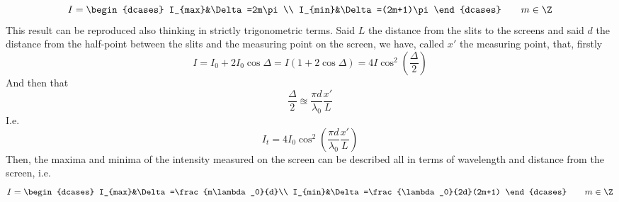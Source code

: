 \documentclass[../electromagnetism.tex]{subfiles}
\begin{document}
\begin{equation}
	I=\begin{dcases}
		I_{max}&\Delta=2m\pi\\
		I_{min}&\Delta=(2m+1)\pi
	\end{dcases}\qquad m\in\Z
	\label{eq:imaximinyoung.yint}
\end{equation}
This result can be reproduced also thinking in strictly trigonometric terms. Said $L$ the distance from the slits to the screens and said $d$ the distance from the half-point between the slits and the measuring point on the screen, we have, called $x'$ the measuring point, that, firstly
\begin{equation*}
	I=I_0+2I_0\cos\Delta=I\left( 1+2\cos\Delta \right)=4I\cos^2\left( \frac{\Delta}{2} \right)
\end{equation*}
And then that
\begin{equation}
	\frac{\Delta}{2}\approxeq\frac{\pi d}{\lambda_0}\frac{x'}{L}
	\label{eq:delta12approx.yint}
\end{equation}
I.e.
\begin{equation*}
	I_t=4I_0\cos^2\left( \frac{\pi d}{\lambda_0}\frac{x'}{L} \right)
\end{equation*}
Then, the maxima and minima of the intensity measured on the screen can be described all in terms of wavelength and distance from the screen, i.e.
\begin{equation}
	I=\begin{dcases}
		I_{max}&\Delta=\frac{m\lambda_0}{d}\\
		I_{min}&\Delta=\frac{\lambda_0}{2d}(2m+1)
	\end{dcases}\qquad m\in\Z
	\label{eq:itot.yint}
\end{equation}
\end{document}
